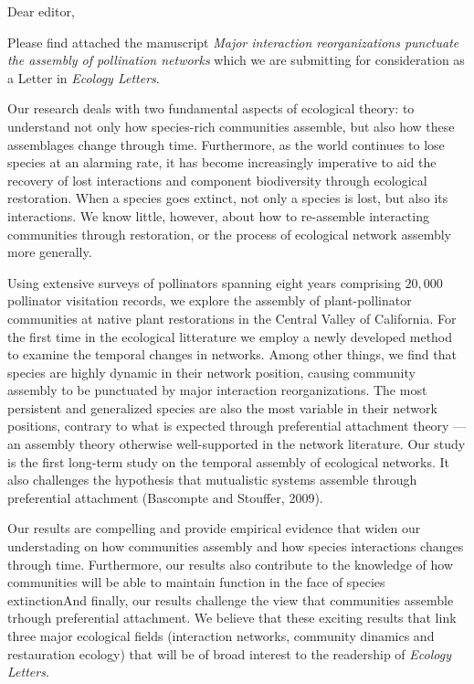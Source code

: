 \documentclass[12pt]{letter}
\begin{document}
\begin{letter}{}

  \opening{Dear editor,}

  Please find attached the manuscript \textit{Major interaction%
    reorganizations punctuate the assembly of pollination networks}
  which we are submitting for consideration as a Letter in
  \textit{Ecology Letters}.

Our research deals with two fundamental aspects of ecological theory: to understand not only how species-rich communities assemble, but also how these assemblages change through time. Furthermore, as the
  world continues to lose species at an alarming rate, it has become
  increasingly imperative to aid the recovery of lost interactions and component biodiversity through ecological restoration. When a species goes extinct, not only a species is lost, but also its interactions. We know little, however, about how to re-assemble interacting communities through restoration, or the process of ecological network assembly
  more generally. 

  Using extensive surveys of pollinators spanning eight years
  comprising \texttildelow $20,000$ pollinator visitation records, we
  explore the assembly of plant-pollinator communities at native plant restorations in the Central Valley of California. For the first time in the ecological litterature we employ a newly
  developed method to examine the temporal changes in networks. Among other things, we find that species are highly dynamic in their network position,
  causing community assembly to be punctuated by major interaction
  reorganizations. The most persistent and generalized species are
  also the most variable in their network positions, contrary to what
  is expected through preferential attachment theory --- an assembly
  theory otherwise well-supported in the network literature. Our study
  is the first long-term study on the temporal assembly of ecological
  networks. It also challenges the hypothesis that mutualistic systems
  assemble through preferential attachment (Bascompte and Stouffer,
  2009).

Our results are compelling and provide empirical evidence that widen our understading on how communities assembly and how species interactions changes through time. Furthermore, our results also contribute to the knowledge of how communities will be able to maintain function in the face of species extinctionAnd finally, our results challenge the view that communities assemble trhough preferential attachment. We believe that these exciting results that link three major ecological fields (interaction networks, community dinamics and restauration ecology) that will be of broad interest to the readership of \textit{Ecology Letters}. 


\end{letter}
\end{document}
